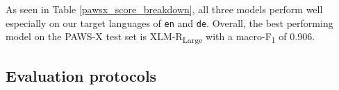 \documentclass[11pt,a4paper]{article}
\begin{document}
As seen in Table \ref{pawsx_score_breakdown}, all three models perform well especially on our target languages of \texttt{en} and \texttt{de}. Overall, the best performing model on the PAWS-X test set is XLM-R\textsubscript{Large} with a macro-F\textsubscript{1} of 0.906.

\subsection{Evaluation protocols}



\end{document}
